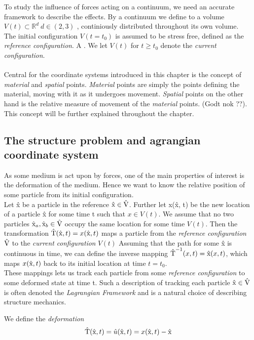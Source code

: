 To study the influence of forces acting on a continuum, we need an accurate framework to describe the effects. By a continuum we define  to a volume $V(t) \subset \mathbb{R}^d \ d \in (2, 3)$ ,  continiously distributed throughout its own volume. The initial configuration $V(t = t_0)$  is assumed to be stress free,  defined as the \textit{reference configuration}. A
. We let $V(t)$ for 
$t \geq t_0$ denote the \textit{current configuration}. \\ \\
Central for the coordinate systems introduced in this chapter is the concept of \textit{material} and \textit{spatial} points. \textit{Material} points are simply the points defining the material, moving with it as it undergoes movement. \textit{Spatial} points on the other hand is the relative measure of movement of the \textit{material} points. (Godt nok ??). This concept will be further explained throughout the chapter.

\subsection{The structure problem and agrangian coordinate system}
As some medium is act upon by forces, one of the main properties of interest is the deformation of the medium. Hence we want to know the relative position of some particle from its initial configuration. \\
Let \^{x} be a particle in the reference  $\text{\^{x}} \in \text{\^{V}}$. 
Further let x(\^x, t) be the new location of a particle \^x for some time t such that $x \in V(t)$. We assume that no two particles $\text{\^{x}}_a, \text{\^{x}}_b \in \text{\^{V}}$ occupy the same location for some time $V(t)$.
Then the transformation $\text{\^{T}}(\text{\^{x}}, t) = x(\text{\^{x}}, t)$ maps a particle  from the \textit{reference configuration} $\text{\^{V}}$ to the  \textit{current configuration} $V(t)$
Assuming that the path for some \^{x} is continuous in time, we can define the inverse mapping $\text{\^{T}}^{-1}(x, t) = \text{\^{x}}(x, t)$, which maps $x(\text{\^{x}}, t)$ back to its initial location at time $t = t_0$. \\
These mappings lets us track each particle from some \textit{reference configuration} to some deformed state at time t. 
Such a description of tracking each particle $\text{\^{x}} \in \text{\^{V}}$ is often denoted the \textit{Lagrangian Framework} and is a natural choice of describing structure mechanics. 

We define the \textit{deformation} 
\begin{align}
\text{\^{T}}(\text{\^{x}}, t) = \hat{u}(\text{\^{x}},t) = x(\text{\^{x}},t) - \text{\^{x}} 
\end{align}

